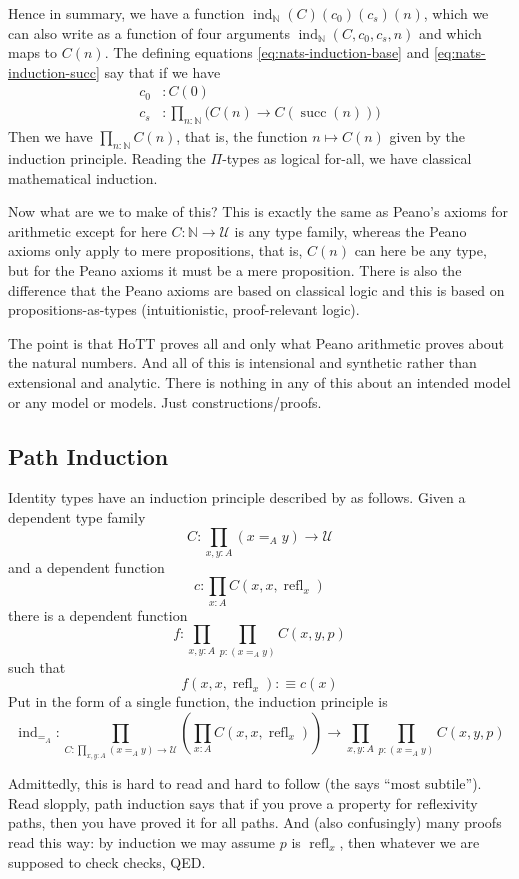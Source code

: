 \documentclass[11pt]{article}
\DeclareMathOperator{\refl}{refl}
\DeclareMathOperator{\successor}{succ}
\DeclareMathOperator{\inductor}{ind}
\newcommand{\nats}{\mathbb{N}}
\newcommand{\universe}{\mathcal{U}}
\begin{document}
Hence in summary, we have a function $\inductor_\nats(C)(c_0)(c_s)(n)$,
which we can also
write as a function of four arguments $\inductor_\nats(C, c_0, c_s, n)$
and which maps to $C(n)$.
The defining equations \eqref{eq:nats-induction-base} and
\eqref{eq:nats-induction-succ} say that if we have
\begin{align*}
   c_0 & : C(0)
   \\
   c_s & : \prod_{n : \nats} \bigl( C(n) \to C(\successor(n)) \bigr)
\end{align*}
Then we have $\prod_{n : \nats} C(n)$, that is, the function $n \mapsto C(n)$
given by the induction principle.
Reading the $\Pi$-types as logical for-all, we have classical mathematical
induction.

Now what are we to make of this?  This is exactly the same as
Peano's axioms for arithmetic except for here $C : \nats \to \universe$
is any type family, whereas the Peano axioms only apply to mere propositions,
that is, $C(n)$ can here be any type, but for the Peano axioms it must be
a mere proposition.  There is also the difference that the Peano axioms
are based on classical logic and this is based on propositions-as-types
(intuitionistic, proof-relevant logic).

The point is that HoTT proves all and only what Peano arithmetic proves
about the natural numbers.  And all of this is intensional and synthetic
rather than extensional and analytic.  There is nothing in any of this
about an intended model or any model or models.  Just constructions/proofs.

\subsection{Path Induction}
\label{sec:path-induction}

Identity types have an induction principle
described by  as follows.
Given a dependent type family
$$
   C : \prod_{x, y : A} (x =_A y) \to \universe
$$
and a dependent function
$$
   c : \prod_{x : A} C(x, x, \refl_x)
$$
there is a dependent function
$$
   f : \prod_{x, y : A} \prod_{p : (x =_A y)} C(x, y, p)
$$
such that
$$
   f(x, x, \refl_x) :\equiv c(x)
$$
Put in the form of a single function, the induction principle is
$$
   \inductor_{=_A} :
   \prod_{C : \prod_{x, y : A} (x =_A y) \to \universe}
   \left( \prod_{x : A} C(x, x, \refl_x) \right)
   \to
   \prod_{x, y : A} \prod_{p : (x =_A y)} C(x, y, p)
$$

Admittedly, this is hard to read and hard to follow
(the  says ``most subtile'').
Read slopply, path induction says that if you prove a property for
reflexivity paths, then you have proved it for all paths.
And (also confusingly) many proofs read this way: by induction we may
assume $p$ is $\refl_x$, then whatever we are supposed to check checks,
QED.
\end{document}
